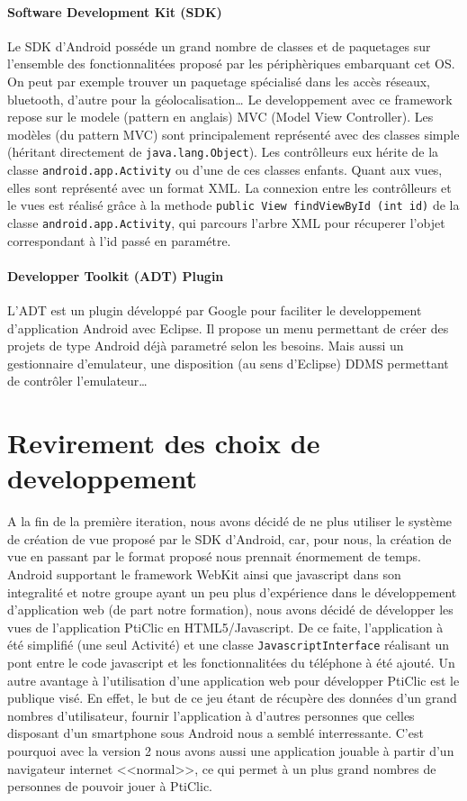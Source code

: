 \documentclass[a4paper,11pt,french]{article}
\def\android{Android\texttrademark{}}
\begin{document}
{\paragraph{Software Development Kit (SDK)}
Le SDK d'\android{} posséde un grand nombre de classes et de paquetages sur l'ensemble des fonctionnalitées proposé par les périphèriques embarquant cet OS. On peut par exemple trouver un paquetage spécialisé dans les accès réseaux, bluetooth, d'autre pour la géolocalisation\dots{} Le developpement avec ce framework repose sur le modele (pattern en anglais) MVC (Model View Controller). Les modèles (du pattern MVC) sont principalement représenté avec des classes simple (héritant directement de \verb!java.lang.Object!). Les contrôlleurs eux hérite de la classe \verb!android.app.Activity! ou d'une de ces classes enfants. Quant aux vues, elles sont représenté avec un format XML.
La connexion entre les contrôlleurs et le vues est réalisé grâce à la methode \verb!public View findViewById (int id)! de la classe \verb!android.app.Activity!, qui parcours l'arbre XML pour récuperer l'objet correspondant à l'id passé en paramétre.

\paragraph{Developper Toolkit (ADT) Plugin}
L'ADT est un plugin développé par Google pour faciliter le developpement d'application \android{} avec Eclipse. Il propose un menu permettant de créer des projets de type \android{} déjà parametré selon les besoins. Mais aussi un gestionnaire d'emulateur, une disposition (au sens d'Eclipse) DDMS permettant de contrôler l'emulateur\dots{}

\section{Revirement des choix de developpement} %
A la fin de la première iteration, nous avons décidé de ne plus utiliser le système de création de vue proposé par le SDK d'\android{}, car, pour nous, la création de vue en passant par le format proposé nous prennait énormement de temps. \android{} supportant le framework WebKit ainsi que javascript dans son integralité et notre groupe ayant un peu plus d'expérience dans le développement d'application web (de part notre formation), nous avons décidé de développer les vues de l'application PtiClic en HTML5/Javascript. De ce faite, l'application à été simplifié (une seul Activité) et une classe \verb!JavascriptInterface! réalisant un pont entre le code javascript et les fonctionnalitées du téléphone à été ajouté.
Un autre avantage à l'utilisation d'une application web pour développer PtiClic est le publique visé. En effet, le but de ce jeu étant de récupère des données d'un grand nombres d'utilisateur, fournir l'application à d'autres personnes que celles disposant d'un smartphone sous \android{} nous a semblé interressante. C'est pourquoi avec la version 2 nous avons aussi une application jouable à partir d'un navigateur internet <<normal>>, ce qui permet à un plus grand nombres de personnes de pouvoir jouer à PtiClic.

}
\end{document}
